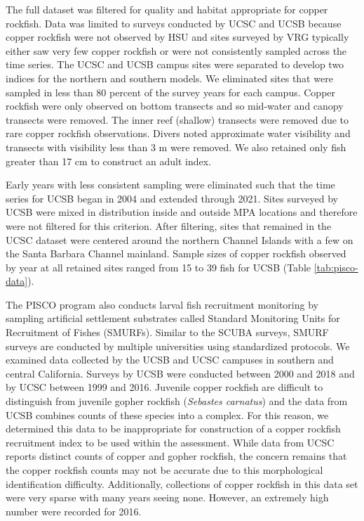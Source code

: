 \documentclass[11pt,
  english,
  letterpaper,
]{article}
\begin{document}
The full dataset was filtered for quality and habitat appropriate for copper rockfish. Data was limited to surveys conducted by UCSC and UCSB because copper rockfish were not observed by HSU and sites surveyed by VRG typically either saw very few copper rockfish or were not consistently sampled across the time series. The UCSC and UCSB campus sites were separated to develop two indices for the northern and southern models. We eliminated sites that were sampled in less than 80 percent of the survey years for each campus. Copper rockfish were only observed on bottom transects and so mid-water and canopy transects were removed. The inner reef (shallow) transects were removed due to rare copper rockfish observations. Divers noted approximate water visibility and transects with visibility less than 3 m were removed. We also retained only fish greater than 17 cm to construct an adult index.

Early years with less consistent sampling were eliminated such that the time series for UCSB began in 2004 and extended through 2021. Sites surveyed by UCSB were mixed in distribution inside and outside MPA locations and therefore were not filtered for this criterion. After filtering, sites that remained in the UCSC dataset were centered around the northern Channel Islands with a few on the Santa Barbara Channel mainland. Sample sizes of copper rockfish observed by year at all retained sites ranged from 15 to 39 fish for UCSB (Table \ref{tab:pisco-data}).

The PISCO program also conducts larval fish recruitment monitoring by sampling artificial settlement substrates called Standard Monitoring Units for Recruitment of Fishes (SMURFs). Similar to the SCUBA surveys, SMURF surveys are conducted by multiple universities using standardized protocols. We examined data collected by the UCSB and UCSC campuses in southern and central California. Surveys by UCSB were conducted between 2000 and 2018 and by UCSC between 1999 and 2016. Juvenile copper rockfish are difficult to distinguish from juvenile gopher rockfish (\emph{Sebastes carnatus}) and the data from UCSB combines counts of these species into a complex. For this reason, we determined this data to be inappropriate for construction of a copper rockfish recruitment index to be used within the assessment. While data from UCSC reports distinct counts of copper and gopher rockfish, the concern remains that the copper rockfish counts may not be accurate due to this morphological identification difficulty. Additionally, collections of copper rockfish in this data set were very sparse with many years seeing none. However, an extremely high number were recorded for 2016.
\end{document}
